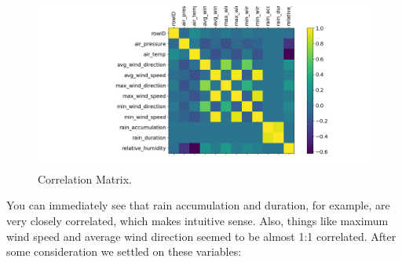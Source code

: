 \documentclass{article}
\begin{document}
  \begin{figure}[h!]
    \begin{center}
      \includegraphics[width=\linewidth]{img/image3.png}
      \caption{Correlation Matrix.}
      \label{fig:snn}
    \end{center}
  \end{figure}
  You can immediately see that rain accumulation and duration, for example, are very closely correlated, which makes intuitive sense. Also, things like maximum wind speed and average wind direction seemed to be almost 1:1 correlated. After some consideration we settled on these variables:
\end{document}
